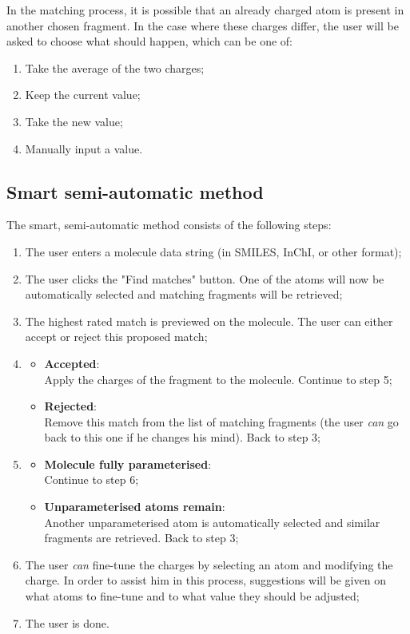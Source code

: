 \noindent
In the matching process, it is possible that an already charged atom is present in another chosen fragment. In the case where these charges differ, the user will be asked to choose what should happen, which can be one of:
\begin{enumerate}[itemsep=.1em, parsep=.2em, topsep=0em]
\item Take the average of the two charges;
\item Keep the current value;
\item Take the new value;
\item Manually input a value.
\end{enumerate}

\subsection{Smart semi-automatic method}
The smart, semi-automatic method consists of the following steps:
\begin{enumerate}[itemsep=.1em, parsep=.2em, topsep=0em]
\item The user enters a molecule data string (in SMILES, InChI, or other format);
\item The user clicks the "Find matches" button. One of the atoms will now be automatically selected and matching fragments will be retrieved;
\item The highest rated match is previewed on the molecule. The user can either accept or reject this proposed match;
\item
\begin{itemize}[leftmargin=0cm, itemsep=.1em, parsep=.1em]
\item[] {\bf Accepted}:\\Apply the charges of the fragment to the molecule. Continue to step 5;
\item[]{\bf Rejected}:\\Remove this match from the list of matching fragments (the user \emph{can} go back to this one if he changes his mind). Back to step 3;
\end{itemize}
\item
\begin{itemize}[leftmargin=0cm, itemsep=.1em, parsep=.1em]
\item[] {\bf Molecule fully parameterised}:\\Continue to step 6;
\item[]{\bf Unparameterised atoms remain}:\\Another unparameterised atom is automatically selected and similar fragments are retrieved. Back to step 3;
\end{itemize}
\item The user \emph{can} fine-tune the charges by selecting an atom and modifying the charge. In order to assist him in this process, suggestions will be given on what atoms to fine-tune and to what value they should be adjusted;
\item The user is done.
\end{enumerate}

